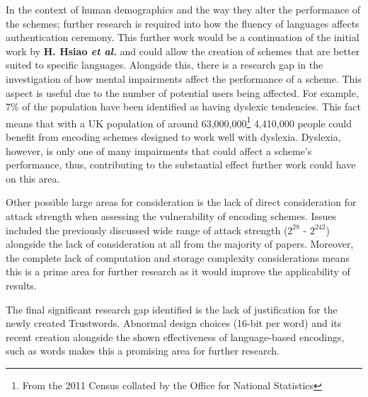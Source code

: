 In the context of human demographics and the way they alter the performance of the schemes; further research is required into how the fluency of languages affects authentication ceremony. This further work would be a continuation of the initial work by \textbf{H. Hsiao \textit{et al.}}\cite{hsiao2009study} and could allow the creation of schemes that are better suited to specific languages.
Alongside this, there is a research gap in the investigation of how mental impairments affect the performance of a scheme. This aspect is useful due to the number of potential users being affected. For example, 7\% of the population have been identified as having dyslexic tendencies\cite{peterson2012developmental}. This fact means that with a UK population of around 63,000,000\footnote{From the 2011 Census collated by the Office for National Statistics}  4,410,000 people could benefit from encoding schemes designed to work well with dyslexia. Dyslexia, however, is only one of many impairments that could affect a scheme's performance, thus, contributing to the substantial effect further work could have on this area.

Other possible large areas for consideration is the lack of direct consideration for attack strength when assessing the vulnerability of encoding schemes. Issues included the previously discussed wide range of attack strength ($2^{28}$ - $2^{242}$) alongside the lack of consideration at all from the majority of papers. Moreover, the complete lack of computation and storage complexity considerations means this is a prime area for further research as it would improve the applicability of results.

The final significant research gap identified is the lack of justification for the newly created Trustwords. Abnormal design choices (16-bit per word) and its recent creation alongside the shown effectiveness of language-based encodings, such as words makes this a promising area for further research. 